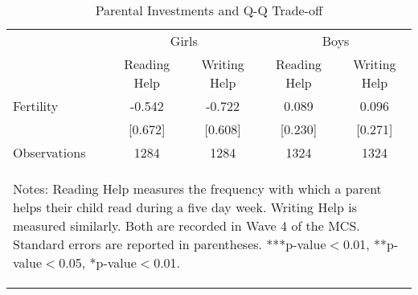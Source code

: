 \begin{table}[htbp]\centering
\def\sym#1{\ifmmode^{#1}\else\(^{#1}\)\fi}
\caption{Parental Investments and Q-Q Trade-off}
\begin{tabular}{l*{4}{c}}
\toprule
                    &\multicolumn{2}{c}{Girls}      &\multicolumn{2}{c}{Boys}       \\\cmidrule(lr){2-3}\cmidrule(lr){4-5}
                    &Reading Help   &Writing Help   &Reading Help   &Writing Help   \\
\midrule
Fertility           &      -0.542   &      -0.722   &       0.089   &       0.096   \\
                    &     [0.672]   &     [0.608]   &     [0.230]   &     [0.271]   \\
\midrule
Observations        &        1284   &        1284   &        1324   &        1324   \\
\bottomrule\multicolumn{5}{p{14.6cm}}{\begin{footnotesize}        
Notes: Reading Help measures the frequency with which a parent helps their child read during a five day week. Writing Help is measured similarly. Both are recorded in Wave 4 of the MCS. Standard errors are reported in parentheses. ***p-value$<$0.01, **p-value$<$0.05, *p-value$<$0.01.                                
\end{footnotesize}}\end{tabular}\end{table}
